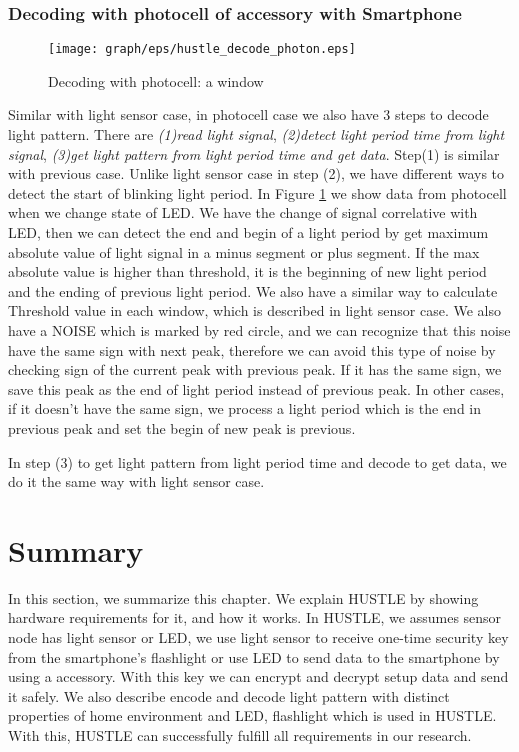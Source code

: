 \subsubsection{Decoding with photocell of accessory with Smartphone}

\begin{figure}[tb]
\centering
\texttt{[image: graph/eps/hustle\_decode\_photon.eps]}
\caption{Decoding with photocell: a window}
\label{fig:hustle_decode_photon}
\end{figure}

Similar with light sensor case, in photocell case we also have 3 steps to decode light pattern. There are \emph{(1)read light signal}, \emph{(2)detect light period time from light signal}, \emph{(3)get light pattern from light period time and get data}. Step(1) is similar with previous case. Unlike light sensor case in step (2), we have different ways to detect the start of blinking light period. In Figure \ref{fig:hustle_decode_photon} we show data from photocell when we change state of LED. We have the change of signal correlative with LED, then we can detect the end and begin of a light period by get maximum absolute value of light signal in a minus segment or plus segment. If the max absolute value is higher than threshold, it is the beginning of new light period and the ending of previous light period. We also have a similar way to calculate Threshold value in each window, which is described in light sensor case. We also have a NOISE which is marked by red circle, and we can recognize that this noise have the same sign with next peak, therefore we can avoid this type of noise by checking sign of the current peak with previous peak. If it has the same sign, we save this peak as the end of light period instead of previous peak. In other cases, if it doesn't have the same sign, we process a light period which is the end in previous peak and set the begin of new peak is previous.

In step (3) to get light pattern from light period time and decode to get data, we do it the same way with light sensor case.

\section{Summary}

In this section, we summarize this chapter. We explain HUSTLE by showing hardware requirements for it, and how it works. In HUSTLE, we assumes sensor node has light sensor or LED, we use light sensor to receive one-time security key from the smartphone's flashlight or use LED to send data to the smartphone by using a accessory. With this key we can encrypt and decrypt setup data and send it safely. We also describe encode and decode light pattern with distinct properties of home environment and LED, flashlight which is used in HUSTLE. With this, HUSTLE can successfully fulfill all requirements in our research.